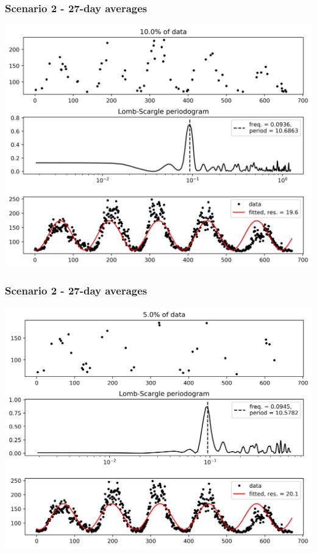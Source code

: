\documentclass{beamer}
\begin{document}
\begin{frame}
\frametitle{Scenario 2 - 27-day averages}
\begin{center}
\includegraphics[scale=0.55]{../scripts/dataset2/periodograms_ny2.0_model1_pg0.9.jpg}
\end{center}
\end{frame}
\begin{frame}
\frametitle{Scenario 2 - 27-day averages}
\begin{center}
\includegraphics[scale=0.55]{../scripts/dataset2/periodograms_ny2.0_model1_pg0.95.jpg}
\end{center}
\end{frame}
\end{document}
